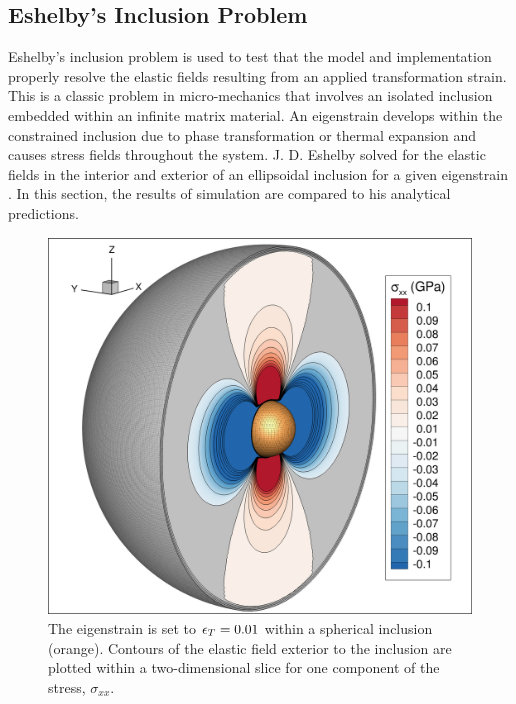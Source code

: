 \subsection{Eshelby's Inclusion Problem}

Eshelby's inclusion problem is used to test that the model and implementation properly resolve the elastic fields resulting from an applied transformation strain. This is a classic problem in micro-mechanics that involves an isolated inclusion embedded within an infinite matrix material. An eigenstrain develops within the constrained inclusion due to phase transformation or thermal expansion and causes stress fields throughout the system. J. D. Eshelby solved for the elastic fields in the interior and exterior of an ellipsoidal inclusion for a given eigenstrain \cite{Eshelby1957, Eshelby1959} . In this section, the results of simulation are compared to his analytical predictions. 



\begin{figure}[h!]
	\begin{center}
	\includegraphics[width=0.6\columnwidth]{ch-fracture/eshelby/inclusion}	
	\caption{The eigenstrain is set to $\epsilon_T=0.01$ within a spherical inclusion (orange). Contours of the elastic field exterior to the inclusion are plotted within a two-dimensional slice for one component of the stress, $\sigma_{xx}$.}
	\label{fig:eshelby_3d}
	\end{center}
\end{figure}

